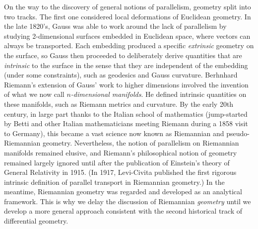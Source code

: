 \begin{hrem*}
    On the way to the discovery of general notions of parallelism, geometry split into two tracks. The first one considered local deformations of Euclidean geometry. In the late 1820's, Gauss was able to work around the lack of parallelism by studying 2-dimensional surfaces embedded in Euclidean space, where vectors can always be transported. Each embedding produced a specific \emph{extrinsic} geometry on the surface, so Gauss then proceeded to deliberately derive quantities that are \emph{intrinsic} to the surface in the sense that they are independent of the embedding (under some constraints), such as geodesics and Gauss curvature. Berhnhard Riemann's extension of Gauss' work to higher dimensions involved the invention of what we now call \emph{$n$-dimensional manifolds}. He defined intrinsic quantities on these manifolds, such as Riemann metrics and curvature. By the early 20th century, in large part thanks to the Italian school of mathematics (jump-started by Betti and other Italian mathematicians meeting Riemann during a 1858 visit to Germany), this became a vast science now known as Riemannian and pseudo-Riemannian geometry. Nevertheless, the notion of parallelism on Riemannian manifolds remained elusive, and Riemann's philosophical notion of geometry remained largely ignored until after the publication of Einstein's theory of General Relativity in 1915. (In 1917, Levi-Civita published the first rigorous intrinsic definition of parallel transport in Riemannian geometry.) In the meantime, Riemannian geometry was regarded and developed as an analytical framework. This is why we delay the discussion of Riemannian \emph{geometry} until we develop a more general approach consistent with the second historical track of differential geometry.


\end{hrem*}
